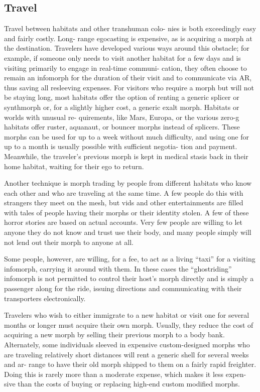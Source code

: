 \subsection{Travel}

Travel between habitats and other transhuman colo-
nies is both exceedingly easy and fairly costly. Long-
range egocasting is expensive, as is acquiring a morph 
at the destination. Travelers have developed various 
ways around this obstacle; for example, if someone 
only needs to visit another habitat for a few days and 
is visiting primarily to engage in real-time communi-
cation, they often choose to remain an infomorph for 
the duration of their visit and to communicate via AR, 
thus saving all resleeving expenses. For visitors who 
require a morph but will not be staying long, most 
habitats offer the option of renting a generic splicer 
or synthmorph or, for a slightly higher cost, a generic 
exalt morph. Habitats or worlds with unusual re-
quirements, like Mars, Europa, or the various zero-g 
habitats offer ruster, aquanaut, or bouncer morphs 
instead of splicers. These morphs can be used for up to 
a week without much difficulty, and using one for up 
to a month is usually possible with sufficient negotia-
tion and payment. Meanwhile, the traveler's previous 
morph is kept in medical stasis back in their home 
habitat, waiting for their ego to return.

Another technique is morph trading by people from 
different habitats who know each other and who are 
traveling at the same time. A few people do this with 
strangers they meet on the mesh, but vids and other 
entertainments are filled with tales of people having 
their morphs or their identity stolen. A few of these 
horror stories are based on actual accounts. Very few 
people are willing to let anyone they do not know and 
trust use their body, and many people simply will not 
lend out their morph to anyone at all. 

Some people, however, are willing, for a fee, to act 
as a living ``taxi'' for a visiting infomorph, carrying 
it around with them. In these cases the ``ghostriding'' 
infomorph is not permitted to control their host's 
morph directly and is simply a passenger along for 
the ride, issuing directions and communicating with 
their transporters electronically.

Travelers who wish to either immigrate to a new 
habitat or visit one for several months or longer 
must acquire their own morph. Usually, they reduce 
the cost of acquiring a new morph by selling their 
previous morph to a body bank. Alternately, some 
individuals sleeved in expensive custom-designed 
morphs who are traveling relatively short distances 
will rent a generic shell for several weeks and ar-
range to have their old morph shipped to them on 
a fairly rapid freighter. Doing this is rarely more 
than a moderate expense, which makes it less expen-
sive than the costs of buying or replacing high-end 
custom modified morphs.

